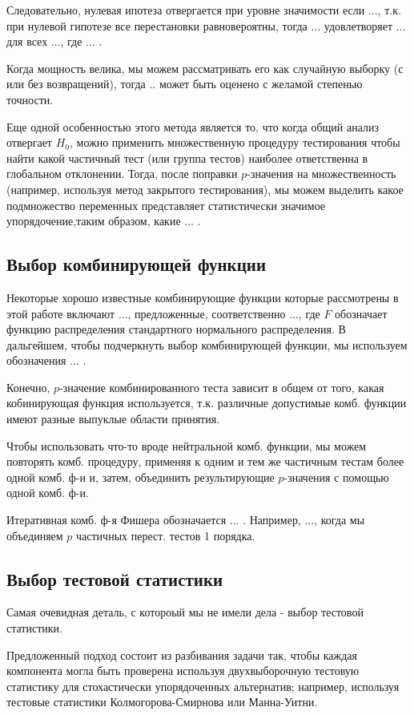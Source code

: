 \documentclass{article}
\begin{document}
Следовательно, нулевая ипотеза отвергается при уровне значимости если ..., т.к. при нулевой гипотезе все перестановки равновероятны, тогда ... удовлетворяет ... для всех ..., где ... .

Когда мощность велика, мы можем рассматривать его как случайную выборку (с или без возвращений), тогда .. может быть оценено с желамой степенью точности.

Еще одной особенностью этого метода является то, что когда общий анализ отвергает $H_0$, можно применить множественную процедуру тестирования чтобы найти какой частичный тест (или группа тестов) наиболее ответственна в глобальном отклонении. Тогда, после поправки $p$-значения на множественность (например, используя метод закрытого тестирования), мы можем выделить какое подмножество переменных представляет статистически значимое упорядочение,таким образом, какие ... .

\subsection{Выбор комбинирующей функции}
Некоторые хорошо известные комбинирующие функции которые рассмотрены в этой работе включают ..., предложенные, соответственно ..., где $F$ обозначает функцию распределения стандартного нормального распределения. В дальгейшем, чтобы подчеркнуть выбор комбинирующей функции, мы используем обозначения ... .

Конечно, $p$-значение комбинированного теста зависит в общем от того, какая кобинирующая функция используется, т.к. различные допустимые комб. функции имеют разные выпуклые области принятия.

Чтобы использовать что-то вроде нейтральной комб. функции, мы можем повторять комб. процедуру, применяя к одним и тем же частичным тестам более одной комб. ф-и и, затем, объединить результирующие $p$-значения с помощью одной комб. ф-и.

Итеративная комб. ф-я Фишера обозначается ... . Например, ..., когда мы объединяем $p$ частичных перест. тестов 1 порядка.

\subsection{Выбор тестовой статистики}
Самая очевидная деталь, с котороый мы не имели дела - выбор тестовой статистики.

Предложенный подход состоит из разбивания задачи так, чтобы каждая компонента могла быть проверена используя двухвыборочную тестовую статистику для стохастически упорядоченных альтернатив; например, используя тестовые статистики Колмогорова-Смирнова или Манна-Уитни.
\end{document}
